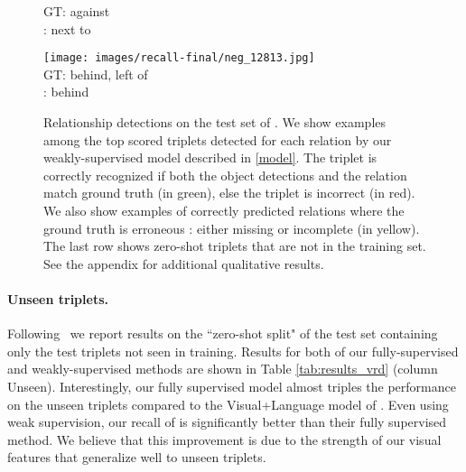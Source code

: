 \documentclass[10pt,twocolumn,letterpaper]{article}
\newcommand{\spaceparagraph}{\vspace{-.35cm}}
\begin{document}
\begin{figure*}[t]
\begin{minipage}[b]{0.18\textwidth}
    		\vspace{0.2ex}
    		\small{
       	GT: against\\
       	\cite{Lu16}: next to
       	}
       	\vspace{0.3ex}
    \end{minipage}
    \hspace{0.005\textwidth}
\begin{minipage}[b]{0.18\textwidth}
    	\centering
       	\texttt{[image: images/recall-final/neg\_12813.jpg]}\\
       	\vspace{0.2ex}
       	\small{
       	GT: behind, left of\\
       	\cite{Lu16}: behind
       	}
       	\vspace{0.3ex}
    \end{minipage}   
     
    \setlength\abovecaptionskip{5pt}
    \caption{Relationship detections on the test set of \cite{Lu16}. We show examples among the top scored triplets detected for each relation by our weakly-supervised model described in \ref{model}. The triplet is correctly recognized if both the object detections and the relation match ground truth (in green), else the triplet is incorrect (in red). We also show examples of correctly predicted relations where the ground truth is erroneous : either missing or incomplete (in yellow). The last row shows zero-shot triplets that are not in the training set. See the appendix for additional qualitative results.}
    \vspace{-.4cm}
    \label{fig:relationship_detection_all}
\end{figure*}



\spaceparagraph
\paragraph{Unseen triplets.} Following~\cite{Lu16} we report results on the ``zero-shot split" of the test set containing only the test triplets not seen in training. Results for both of our fully-supervised and weakly-supervised methods are shown in Table \ref{tab:results_vrd} (column Unseen). Interestingly, our fully supervised model almost triples the performance on the unseen triplets compared to the Visual+Language model of \cite{Lu16}. Even using weak supervision, our recall of  is significantly better than their fully supervised method. We believe that this improvement is due to the strength of our visual features that generalize well to unseen triplets. 
\end{document}
